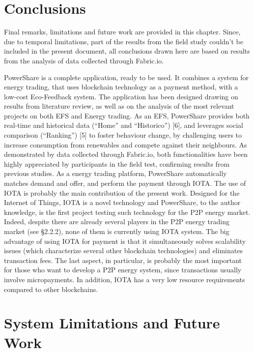 \cleardoublepage
\label{chap:conclusion1}


\section{Conclusions}

Final remarks, limitations and future work are provided in this chapter. Since, due to temporal limitations, part of the results from the field study couldn’t be included in the present document, all conclusions drawn here are based on results from the analysis of data collected through Fabric.io. 
	
PowerShare is a complete application, ready to be used. It combines a system for energy trading, that uses blockchain technology as a payment method, with a low-cost Eco-Feedback system. The application has been designed drawing on results from literature review, as well as on the analysis of the most relevant projects on both EFS and Energy trading.
As an EFS, PowerShare provides both real-time and historical data (“Home” and “Historico”) [6], and leverages social comparison (“Ranking”) [5] to foster behaviour change, by challenging users to increase consumption from renewables and compete against their neighbours. As demonstrated by data collected through Fabric.io, both functionalities have been highly appreciated by participants in the field test, confirming results from previous studies.
As a energy trading platform, PowerShare automatically matches demand and offer, and perform the payment through IOTA. The use of IOTA is probably the main contribution of the present work. Designed for the Internet of Things, IOTA is a novel technology and PowerShare, to the author knowledge, is the first project testing such technology for the P2P energy market. Indeed, despite there are already several players in the P2P energy trading market (see §2.2.2), none of them is currently using IOTA system. The big advantage of using IOTA for payment is that it simultaneously solves scalability issues (which characterize several other blockchain technologies) and eliminates transaction fees. The last aspect, in particular, is probably the most important for those who want to develop a P2P energy system, since transactions usually involve micropayments. In addition, IOTA has a very low resource requirements compared to other blockchains. 



\section{System Limitations and Future Work}
